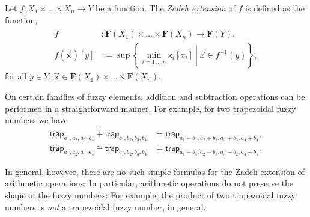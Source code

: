 \documentclass[runningheads]{llncs}
\renewcommand{\emptyset}{\varnothing}
\renewcommand{\emph}[1]{{\it #1}}
\begin{document}
\begin{definition}\label{def:extension_principle}
Let $f:X_1\times\dots \times X_n \to Y$ be a function. The \emph{Zadeh extension} of $f$ is defined as the function, 
\begin{align*}
 \widetilde{f} & \colon \mathbf{F}(X_1) \times \dots \times \mathbf{F}(X_n) \rightarrow \mathbf{F}(Y),  \\ 
   \widetilde{f}(\vec{\mathsf{x}})[y]
& := 
\sup \left\{\left.\min_{i=1,\dots n} \mathsf{x}_i[x_i] \:\right\vert\: \vec x \in f^{-1}(y) \right\}, 
\end{align*}
for all $y\in Y$, $\vec{\mathsf{x}} \in \mathbf{F}(X_1) \times \dots \times \mathbf{F}(X_n)$.
\end{definition}



On certain families of fuzzy elements, addition and subtraction operations can be performed in a straightforward manner. For example, for two trapezoidal fuzzy numbers we have
\begin{align*}
    \mathsf{trap}_{a_1,a_2,a_3,a_4} \  \widetilde{+} \ \mathsf{trap}_{b_1,b_2,b_3,b_4} &= \mathsf{trap}_{a_1 + b_1, a_2 + b_2, a_3 + b_3, a_4 + b_4},\\
    \mathsf{trap}_{a_1,a_2,a_3,a_4} \ \widetilde{-} \ \mathsf{trap}_{b_1,b_2,b_3,b_4} &= \mathsf{trap}_{a_1 - b_4, a_2 - b_3, a_3 - b_2, a_4 - b_1}.
\end{align*}

In general, however, there are no such simple formulas for the Zadeh extension of arithmetic operations. In particular, arithmetic operations do not preserve the shape of the fuzzy numbers:
For example, the product of two trapezoidal fuzzy numbers is \emph{not} a trapezoidal fuzzy number, in general.
%
\end{document}
